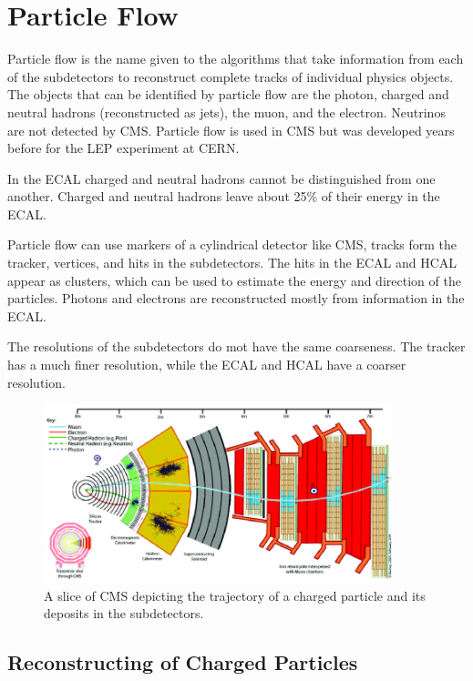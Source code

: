 \chapter{Particle Flow}\label{chap:pflow}




Particle flow is the name given to the algorithms that take information from each of the subdetectors to reconstruct complete tracks of individual physics objects. The objects that can be identified by particle flow are the photon, charged and neutral hadrons (reconstructed as jets), the muon, and the electron. Neutrinos are not detected by CMS. Particle flow is used in CMS but was developed years before for the LEP experiment at CERN.

In the ECAL charged and neutral hadrons cannot be distinguished from one another. Charged and neutral hadrons leave about 25\% of their energy in the ECAL.


Particle flow can use markers of a cylindrical detector like CMS, tracks form the tracker, vertices, and hits in the subdetectors. The hits in the ECAL and HCAL appear as clusters, which can be used to estimate the energy and direction of the particles. Photons and electrons are reconstructed mostly from information in the ECAL. 

The resolutions of the subdetectors do mot have the same coarseness. The tracker has a much finer resolution, while the ECAL and HCAL have a coarser resolution.

 \begin{figure}[h]
\centering
\includegraphics[width=0.9\textwidth]{figures/cms_slice}
\caption{A slice of CMS depicting the trajectory of a charged particle and its deposits in the subdetectors.}
\label{fig:cms_slice}
\end{figure}

\section{Reconstructing of Charged Particles}


